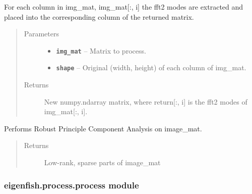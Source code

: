 \documentclass[letterpaper,10pt,english]{sphinxmanual}
\begin{document}
\begin{fulllineitems}
\label{eigenfish.process:eigenfish.process.math.fft2_series}
For each column in img\_mat, img\_mat{[}:, i{]} the fft2 modes are extracted and
placed into the corresponding column of the returned matrix.
\begin{quote}\begin{description}
\item[{Parameters}] \leavevmode\begin{itemize}
\item {} 
\textbf{\texttt{img\_mat}} -- Matrix to process.

\item {} 
\textbf{\texttt{shape}} -- Original (width, height) of each column of img\_mat.

\end{itemize}

\item[{Returns}] \leavevmode
New numpy.ndarray matrix, where return{[}:, i{]} is the fft2 modes of
img\_mat{[}:, i{]}.

\end{description}\end{quote}

\end{fulllineitems}


\begin{fulllineitems}
\label{eigenfish.process:eigenfish.process.math.rpca}
Performs Robust Principle Component Analysis on image\_mat.
\begin{quote}\begin{description}
\item[{Returns}] \leavevmode
Low-rank, sparse parts of image\_mat

\end{description}\end{quote}

\end{fulllineitems}



\subsubsection{eigenfish.process.process module}
\label{eigenfish.process:module-eigenfish.process.process}\label{eigenfish.process:eigenfish-process-process-module}
\end{document}
